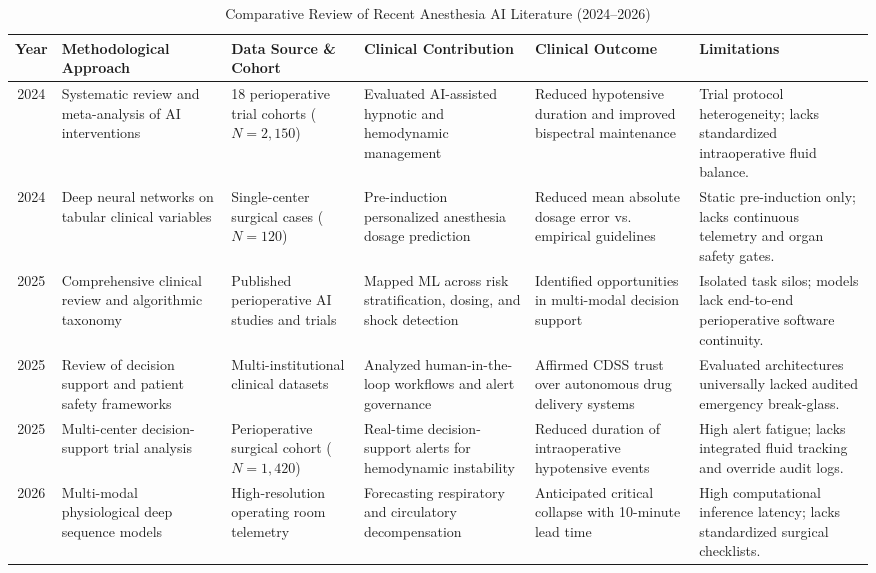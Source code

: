 \documentclass[conference]{IEEEtran}
\begin{document}
\begin{table}[t]
\centering
\caption{Comparative Review of Recent Anesthesia AI Literature (2024--2026)}
\label{tab:lit_comparison}
\begin{tabularx}{\textwidth}{c p{3.2cm} p{2.8cm} p{3.2cm} p{2.8cm} p{3.5cm}}
\toprule
\textbf{Year} & \textbf{Methodological Approach} & \textbf{Data Source \& Cohort} & \textbf{Clinical Contribution} & \textbf{Clinical Outcome} & \textbf{Limitations} \\
\midrule
2024 & Systematic review and meta-analysis of AI interventions & 18 perioperative trial cohorts ($N=2,150$) & Evaluated AI-assisted hypnotic and hemodynamic management & Reduced hypotensive duration and improved bispectral maintenance & Trial protocol heterogeneity; lacks standardized intraoperative fluid balance. \\
2024 & Deep neural networks on tabular clinical variables & Single-center surgical cases ($N=120$) & Pre-induction personalized anesthesia dosage prediction & Reduced mean absolute dosage error vs. empirical guidelines & Static pre-induction only; lacks continuous telemetry and organ safety gates. \\
2025 & Comprehensive clinical review and algorithmic taxonomy & Published perioperative AI studies and trials & Mapped ML across risk stratification, dosing, and shock detection & Identified opportunities in multi-modal decision support & Isolated task silos; models lack end-to-end perioperative software continuity. \\
2025 & Review of decision support and patient safety frameworks & Multi-institutional clinical datasets & Analyzed human-in-the-loop workflows and alert governance & Affirmed CDSS trust over autonomous drug delivery systems & Evaluated architectures universally lacked audited emergency break-glass. \\
2025 & Multi-center decision-support trial analysis & Perioperative surgical cohort ($N=1,420$) & Real-time decision-support alerts for hemodynamic instability & Reduced duration of intraoperative hypotensive events & High alert fatigue; lacks integrated fluid tracking and override audit logs. \\
2026 & Multi-modal physiological deep sequence models & High-resolution operating room telemetry & Forecasting respiratory and circulatory decompensation & Anticipated critical collapse with 10-minute lead time & High computational inference latency; lacks standardized surgical checklists. \\
\bottomrule
\end{tabularx}
\end{table}
\end{document}

